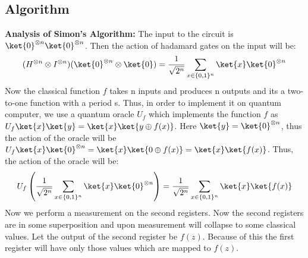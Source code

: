 \documentclass[12pt, oneside]{book}
\theoremstyle{definition}
\theoremstyle{definition}
\theoremstyle{remark}
\begin{document}
\subsection{Algorithm}
\textbf{Analysis of Simon's Algorithm: }
The input to the circuit is $\ket{0}^{\otimes n}\ket{0}^{\otimes n}$. 
Then the action of hadamard gates on the input will be:
\[
(H^{\otimes n} \otimes I^{\otimes n})(\ket{0}^{\otimes n} \otimes \ket{0})=\frac{1}{\sqrt{2^n}}\sum_{x \in \{0,1\}^n}\ket{x}\ket{0}^{\otimes n}
\]
Now the classical function $f$ takes n inputs and produces n outputs and its a two-to-one function with a period s. Thus, in order to implement it on quantum computer, 
we use a quantum oracle $U_f$ which implements the function $f$ as $U_f\ket{x}\ket{y}=\ket{x}\ket{y\oplus f(x)}$.
Here $\ket{y}=\ket{0}^{\otimes n}$, thus the action of the oracle will be $U_f\ket{x}\ket{0}^{\otimes n}=\ket{x}\ket{0 \oplus f(x)}=\ket{x}\ket{f(x)}$.
Thus, the action of the oracle will be:
\[
    U_f\left(\frac{1}{\sqrt{2^n}}\sum_{x \in \{0,1\}^n}\ket{x}\ket{0}^{\otimes n}\right)=\frac{1}{\sqrt{2^n}}\sum_{x \in \{0,1\}^n}\ket{x}\ket{f(x)}
\]
Now  we perform a measurement on the second registers. Now the second registers are in some superposition and upon measurement will 
collapse to some classical values. Let the output of the second register be $f(z)$. Because of this the first register will have only those values which are mapped to $f(z)$.
\end{document}
